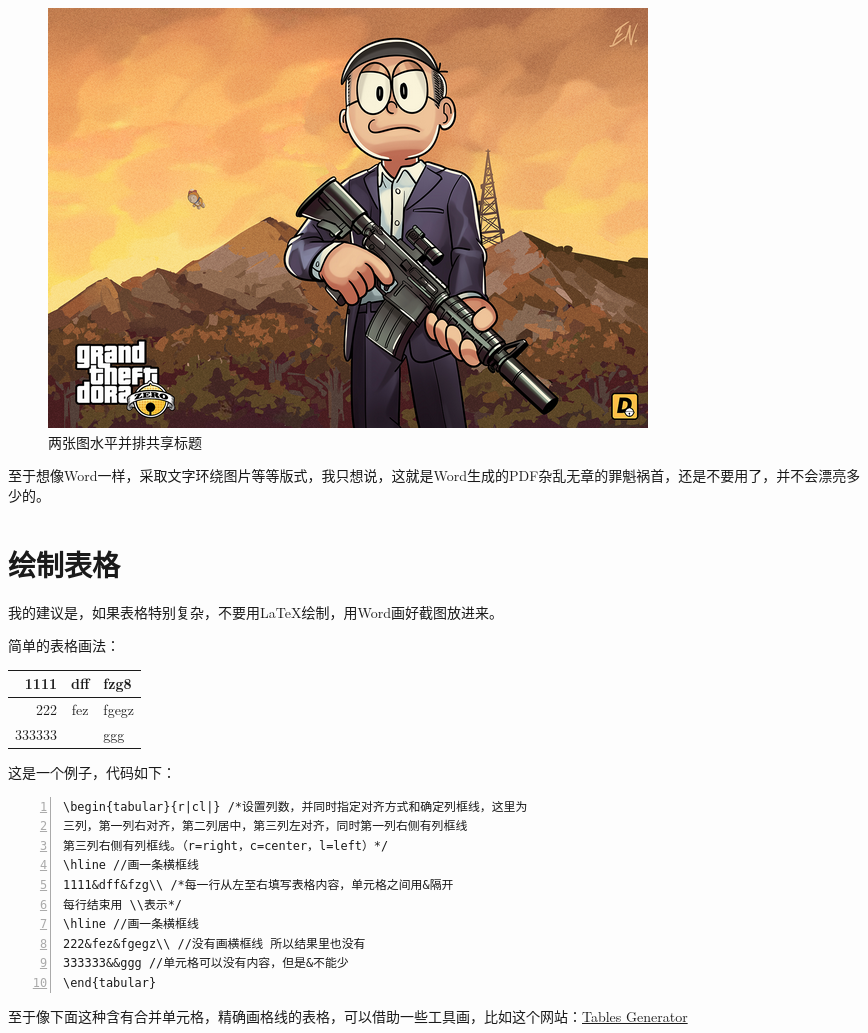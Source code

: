 \documentclass[12pt,a4paper,oneside]{book}
\begin{document}
{\begin{figure}[h]
\includegraphics[scale=0.21]{xf.png}
\caption{两张图水平并排共享标题}
\label{pic:dora}
\end{figure}
\par
至于想像Word一样，采取文字环绕图片等等版式，我只想说，这就是Word生成的PDF杂乱无章的罪魁祸首，还是不要用了，并不会漂亮多少的。
\vspace{2em}
\section{绘制表格}
我的建议是，如果表格特别复杂，不要用\LaTeX 绘制，用Word画好截图放进来。
\par
简单的表格画法：
\par
\begin{center}
\begin{tabular}{r|cl|}
\hline
1111&dff&fzg8\\
\hline
222&fez&fgegz\\
333333&&ggg\\
\end{tabular}
\end{center}

\par
这是一个例子，代码如下：

\par

\begin{lstlisting}[language={[ANSI]C}, numbers=left, numberstyle=\tiny, keywordstyle=\color{blue!70},  frame=shadowbox, rulesepcolor=\color{red!20!green!20!blue!20}]
\begin{tabular}{r|cl|} /*设置列数，并同时指定对齐方式和确定列框线，这里为
三列，第一列右对齐，第二列居中，第三列左对齐，同时第一列右侧有列框线
第三列右侧有列框线。（r=right，c=center，l=left）*/
\hline //画一条横框线
1111&dff&fzg\\ /*每一行从左至右填写表格内容，单元格之间用&隔开
每行结束用 \\表示*/
\hline //画一条横框线
222&fez&fgegz\\ //没有画横框线 所以结果里也没有
333333&&ggg //单元格可以没有内容，但是&不能少
\end{tabular}
\end{lstlisting}
\par
至于像下面这种含有合并单元格，精确画格线的表格，可以借助一些工具画，比如这个网站：\href{http://www.tablesgenerator.com/}{Tables Generator}

}
\end{document}
